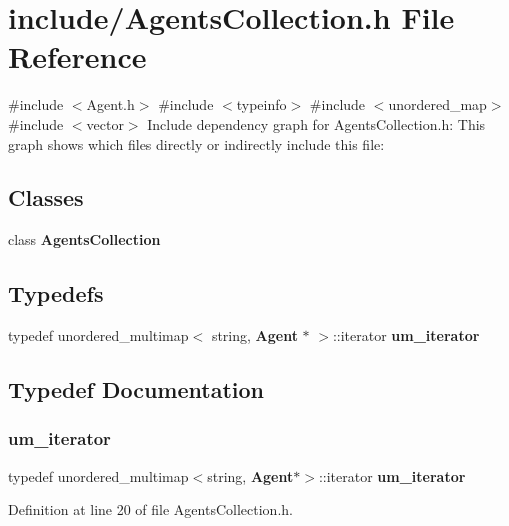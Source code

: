 \section{include/\+Agents\+Collection.h File Reference}
\label{_agents_collection_8h}
{\ttfamily \#include $<$Agent.\+h$>$}\newline
{\ttfamily \#include $<$typeinfo$>$}\newline
{\ttfamily \#include $<$unordered\+\_\+map$>$}\newline
{\ttfamily \#include $<$vector$>$}\newline
Include dependency graph for Agents\+Collection.\+h\+:
This graph shows which files directly or indirectly include this file\+:
\subsection*{Classes}
\begin{DoxyCompactItemize}
\item 
class \textbf{ Agents\+Collection}
\end{DoxyCompactItemize}
\subsection*{Typedefs}
\begin{DoxyCompactItemize}
\item 
typedef unordered\+\_\+multimap$<$ string, \textbf{ Agent} $\ast$ $>$\+::iterator \textbf{ um\+\_\+iterator}
\end{DoxyCompactItemize}


\subsection{Typedef Documentation}
\mbox{\label{_agents_collection_8h_afde47bc45d604b8b8c72755072376679}} 
\subsubsection{um\+\_\+iterator}
{\footnotesize\ttfamily typedef unordered\+\_\+multimap$<$string, \textbf{ Agent}$\ast$$>$\+::iterator \textbf{ um\+\_\+iterator}}



Definition at line 20 of file Agents\+Collection.\+h.

